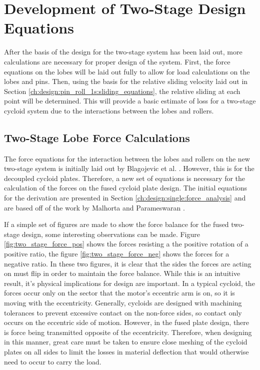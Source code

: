 \section{Development of Two-Stage Design Equations} \label{ch:dual:equations}

After the basis of the design for the two-stage system has been laid out, more calculations are necessary for proper design of the system. First, the force equations on the lobes will be laid out fully to allow for load calculations on the lobes and pins. Then, using the basis for the relative sliding velocity laid out in Section \ref{ch:design:pin_roll_1s:sliding_equations}, the relative sliding at each point will be determined. This will provide a basic estimate of loss for a two-stage cycloid system due to the interactions between the lobes and rollers. 

\subsection{Two-Stage Lobe Force Calculations} \label{ch:dual:equtions:force}

The force equations for the interaction between the lobes and rollers on the new two-stage system is initially laid out by Blagojevic et al. \cite{ref:new_two_stage}. However, this is for the decoupled cycloid plates. Therefore, a new set of equations is necessary for the calculation of the forces on the fused cycloid plate design. The initial equations for the derivation are presented in Section \ref{ch:design:single:force_analysis} and are based off of the work by Malhorta and Parameswaran \cite{ref:malhorta_2}. 

If a simple set of figures are made to show the force balance for the fused two-stage design, some interesting observations can be made. Figure \ref{fig:two_stage_force_pos} shows the forces resisting a the positive rotation of a positive ratio, the figure \ref{fig:two_stage_force_neg} shows the forces for a negative ratio. In these two figures, it is clear that the sides the forces are acting on must flip in order to maintain the force balance. While this is an intuitive result, it's physical implications for design are important. In a typical cycloid, the forces occur only on the sector that the motor's eccentric arm is on, so it is moving with the eccentricity. Generally, cycloids are designed with machining tolerances to prevent excessive contact on the non-force sides, so contact only occurs on the eccentric side of motion. However, in the fused plate design, there is force being transmitted opposite of the eccentricity. Therefore, when designing in this manner, great care must be taken to ensure close meshing of the cycloid plates on all sides to limit the losses in material deflection that would otherwise need to occur to carry the load. 


